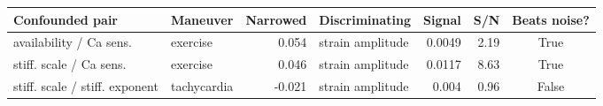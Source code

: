 {\small
\begin{tabular}{llrlrrc}
\toprule
Confounded pair & Maneuver & Narrowed & Discriminating & Signal & S/N & Beats noise? \\
\midrule
availability / Ca sens. & exercise & 0.054 & strain amplitude & 0.0049 & 2.19 & True \\
stiff. scale / Ca sens. & exercise & 0.046 & strain amplitude & 0.0117 & 8.63 & True \\
stiff. scale / stiff. exponent & tachycardia & -0.021 & strain amplitude & 0.004 & 0.96 & False \\
\bottomrule
\end{tabular}
}
